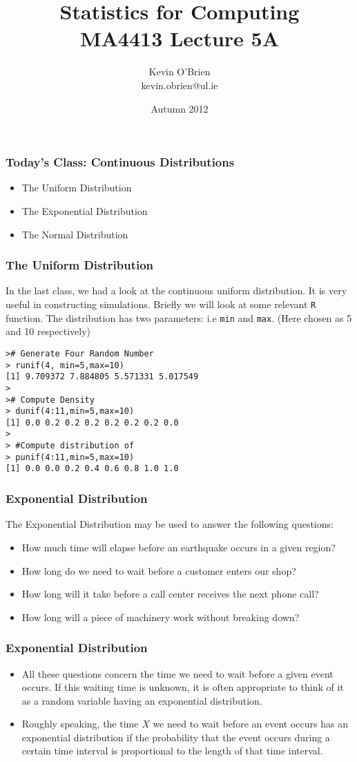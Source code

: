 \documentclass[a4]{beamer}
\title[MA4413]{Statistics for Computing \\ {\normalsize MA4413 Lecture 5A}}
\author[Kevin O'Brien]{Kevin O'Brien \\ {\scriptsize kevin.obrien@ul.ie}}
\date{Autumn 2012}
\institute[Maths \& Stats]{Dept. of Mathematics \& Statistics, \\ University \textit{of} Limerick}
\begin{document}
\begin{frame}
\titlepage
\end{frame}
\begin{frame}[fragile]
\frametitle{Today's Class: Continuous Distributions}
\begin{itemize}
\item The Uniform Distribution
\item The Exponential Distribution
\item The Normal Distribution
\end{itemize}
\end{frame}
\begin{frame}[fragile]
\frametitle{The Uniform Distribution}
In the last class, we had a look at the continuous uniform distribution. It is very useful in constructing simulations. Briefly we will look at some relevant \texttt{R} function.
The distribution has two parameters: i.e \texttt{min} and \texttt{max}. (Here chosen as 5 and 10 respectively)
\begin{verbatim}
># Generate Four Random Number
> runif(4, min=5,max=10)
[1] 9.709372 7.884805 5.571331 5.017549
>
># Compute Density
> dunif(4:11,min=5,max=10)
[1] 0.0 0.2 0.2 0.2 0.2 0.2 0.2 0.0
>
> #Compute distribution of
> punif(4:11,min=5,max=10)
[1] 0.0 0.0 0.2 0.4 0.6 0.8 1.0 1.0
\end{verbatim}

\end{frame}


\begin{frame}[fragile]
\frametitle{Exponential Distribution}
The Exponential Distribution may be used to answer the following questions:
\begin{itemize}
\item How much time will elapse before an earthquake occurs in a given region?
\item How long do we need to wait before a customer enters our shop?
\item How long will it take before a call center receives the next phone call?
\item How long will a piece of machinery work without breaking down?
\end{itemize}
\end{frame}

\begin{frame}[fragile]
\frametitle{Exponential Distribution}

\begin{itemize}
\item All these questions concern the time we need to wait before a given event occurs. If this waiting time is unknown, it is often appropriate to think of it as a random variable having an exponential distribution.
\item Roughly speaking, the time $X$ we need to wait before an event occurs has an exponential distribution if the probability that the event occurs during a certain time interval is proportional to the length of that time interval.

\end{itemize}
\end{frame}
\end{document}
